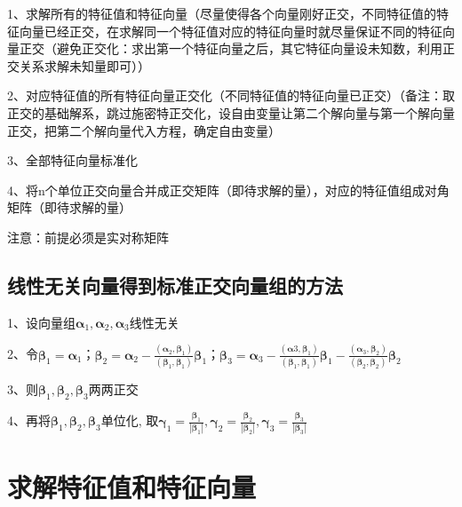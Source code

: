 1、求解所有的特征值和特征向量（尽量使得各个向量刚好正交，不同特征值的特征向量已经正交，在求解同一个特征值对应的特征向量时就尽量保证不同的特征向量正交（避免正交化：求出第一个特征向量之后，其它特征向量设未知数，利用正交关系求解未知量即可））

2、对应特征值的所有特征向量正交化（不同特征值的特征向量已正交）（备注：取正交的基础解系，跳过施密特正交化，设自由变量让第二个解向量与第一个解向量正交，把第二个解向量代入方程，确定自由变量）

3、全部特征向量标准化

4、将n个单位正交向量合并成正交矩阵（即待求解的量），对应的特征值组成对角矩阵（即待求解的量）

注意：前提必须是实对称矩阵



\subsection{线性无关向量得到标准正交向量组的方法}

1、设向量组$ \boldsymbol{\alpha}_{1}, \boldsymbol{\alpha}_{2}, \boldsymbol{\alpha}_{3} $线性无关

2、令$ \boldsymbol{\beta}_{1}=\boldsymbol{\alpha}_{1} $；$ \boldsymbol{\beta}_{2}=\boldsymbol{\alpha}_{2}-\frac{\left(\boldsymbol{\alpha}_{2}, \boldsymbol{\beta}_{1}\right)}{\left(\boldsymbol{\beta}_{1}, \boldsymbol{\beta}_{1}\right)} \boldsymbol{\beta}_{1} $；$ \boldsymbol{\beta}_{3}=\boldsymbol{\alpha}_{3}-\frac{\left(\boldsymbol{\alpha}{3}, \boldsymbol{\beta}_{1}\right)}{\left(\boldsymbol{\beta}_{1}, \boldsymbol{\beta}_{1}\right)} \boldsymbol{\beta}_{1}-\frac{\left(\boldsymbol{\alpha}_{3}, \boldsymbol{\beta}_{2}\right)}{\left(\boldsymbol{\beta}_{2}, \boldsymbol{\beta}_{2}\right)} \boldsymbol{\beta}_{2} $

3、则$ \boldsymbol{\beta}_{1}, \boldsymbol{\beta}_{2}, \boldsymbol{\beta}_{3} $两两正交

4、再将$ \boldsymbol{\beta}_{1}, \boldsymbol{\beta}_{2}, \boldsymbol{\beta}_{3} $单位化, 取$ \boldsymbol{\gamma}_{1}=\frac{\boldsymbol{\beta}_{1}}{\left|\boldsymbol{\beta}_{1}\right|}, \boldsymbol{\gamma}_{2}=\frac{\boldsymbol{\beta}_{2}}{\left|\boldsymbol{\beta}_{2}\right|}, \boldsymbol{\gamma}_{3}=\frac{\boldsymbol{\beta}_{3}}{\left|\boldsymbol{\beta}_{3}\right|} $



\section{求解特征值和特征向量}




